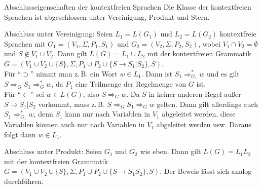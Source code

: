 \begin{Satz}{Abschlusseigenschaften der kontextfreien Sprachen}
    Die Klasse der kontextfreien Sprachen ist abgeschlossen unter
    Vereinigung, Produkt und Stern.
\end{Satz}

\begin{Beweis}
    Abschluss unter Vereinigung:
    Seien $L_1 = L(G_1)$ und $L_2 = L(G_2)$ kontextfreie Sprachen mit
    $G_1 = (V_1, \Sigma, P_1, S_1)$ und $G_2 = (V_2, \Sigma, P_2, S_2)$, wobei
    $V_1 \cap V_2 = \emptyset$ und $S \notin V_1 \cup V_2$.
    Dann gilt $L(G) = L_1 \cup L_2$ mit der kontextfreien Grammatik\\
    $G = (V_1 \cup V_2 \cup \{S\}, \Sigma,
    P_1 \cup P_2 \cup \{S \rightarrow S_1 | S_2\}, S)$.\\
    Für "`$\supset$"' nimmt man z.\,B. ein Wort $w \in L_1$.
    Dann ist $S_1 \Rightarrow_{G_1}^\ast w$ und es gilt
    $S \Rightarrow_G S_1 \Rightarrow_G^\ast w$, da $P_1$ eine Teilmenge der
    Regelmenge von $G$ ist.\\
    Für "`$\subset$"' sei $w \in L(G)$, also $S \Rightarrow_G w$.
    Da $S$ in keiner anderen Regel außer $S \rightarrow S_1 | S_2$ vorkommt,
    muss z.\,B. $S \Rightarrow_G S_1 \Rightarrow_G w$ gelten.
    Dann gilt allerdings auch $S_1 \Rightarrow_{G_1}^\ast w$, denn
    $S_1$ kann nur nach Variablen in $V_1$ abgeleitet werden,
    diese Variablen können auch nur nach Variablen in $V_1$ abgeleitet werden
    usw.
    Daraus folgt dann $w \in L_1$.
    
    Abschluss unter Produkt:
    Seien $G_1$ und $G_2$ wie eben.
    Dann gilt $L(G) = L_1 L_2$ mit der kontextfreien Grammatik
    $G = (V_1 \cup V_2 \cup \{S\}, \Sigma,
    P_1 \cup P_2 \cup \{S \rightarrow S_1 S_2\}, S)$.
    Der Beweis lässt sich analog durchführen.
    

\end{Beweis}
